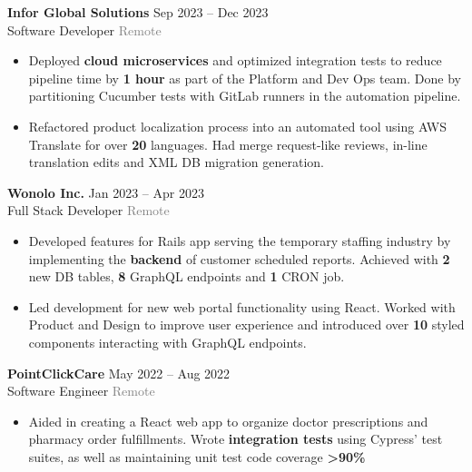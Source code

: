 \documentclass[10pt]{developercv} %
\begin{document}
\begin{minipage}[t]{\textwidth}
	\vspace{-\baselineskip}

	\textbf{Infor Global Solutions} \hfill Sep 2023 -- Dec 2023 \\
	Software Developer \hfill \textcolor{gray}{Remote}
	\begin{itemize}[noitemsep,topsep=0pt]
		\item Deployed \textbf{cloud microservices} and optimized integration tests to
		reduce pipeline time by \textbf{1 hour} as part of the Platform and Dev Ops team.
		Done by partitioning Cucumber tests with GitLab runners in the automation pipeline.
		\item Refactored product localization process into an automated tool using
		AWS Translate for over \textbf{20} languages. Had merge request-like reviews,
		in-line translation edits and XML DB migration generation.
	\end{itemize}
	\vspace{0.3em}

	\textbf{Wonolo Inc.} \hfill Jan 2023 -- Apr 2023 \\
	Full Stack Developer \hfill \textcolor{gray}{Remote}
	\begin{itemize}[noitemsep,topsep=0pt]
		\item Developed features for Rails app serving the temporary staffing industry by implementing the
		\textbf{backend} of customer scheduled reports. Achieved with \textbf{2} new DB tables, \textbf{8} GraphQL endpoints and \textbf{1} CRON job.
		\item Led development for new web portal functionality using React. Worked with Product and Design to improve user
		experience and introduced over \textbf{10} styled components interacting with GraphQL endpoints.
	\end{itemize}
	\vspace{0.3em}

	\textbf{PointClickCare} \hfill May 2022 -- Aug 2022\\
	Software Engineer \hfill \textcolor{gray}{Remote}
	\begin{itemize}[noitemsep,topsep=0pt]
		\item Aided in creating a React web app to organize doctor prescriptions and pharmacy order fulfillments.
		Wrote \textbf{integration tests} using Cypress' test suites, as well as maintaining unit test code coverage \textbf{>90\%}
	\end{itemize}
	\vspace{0.3em}


\end{minipage}
\end{document}
